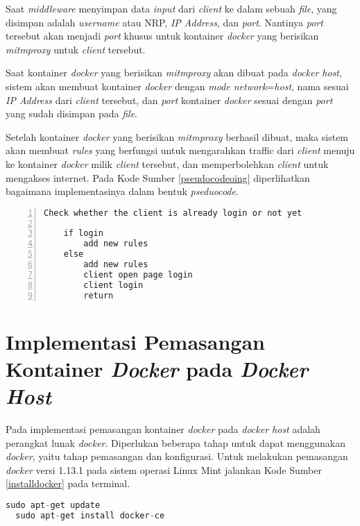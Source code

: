   Saat \textit{middleware} menyimpan data \textit{input} dari \textit{client} ke dalam sebuah \textit{file}, yang disimpan adalah \textit{username} atau NRP, \textit{IP Address}, dan \textit{port}. Nantinya \textit{port} tersebut akan menjadi \textit{port} khusus untuk kontainer \textit{docker} yang berisikan \textit{mitmproxy} untuk \textit{client} tersebut.
  
  Saat kontainer \textit{docker} yang berisikan \textit{mitmproxy} akan dibuat pada \textit{docker host}, sistem akan membuat kontainer \textit{docker} dengan \textit{mode network}=\textit{host}, nama sesuai \textit{IP Address} dari \textit{client} tersebut, dan \textit{port} kontainer \textit{docker} sesuai dengan \textit{port} yang sudah disimpan pada \textit{file}.
  
  Setelah kontainer \textit{docker} yang berisikan \textit{mitmproxy} berhasil dibuat, maka sistem akan membuat \textit{rules} yang berfungsi untuk mengarahkan traffic dari \textit{client} menuju ke kontainer \textit{docker} milik \textit{client} tersebut, dan memperbolehkan \textit{client} untuk mengakses internet. Pada Kode Sumber \ref{pseudocodeoing} diperlihatkan bagaimana implementasinya dalam bentuk \textit{pseduocode}.
  \newline
  \begin{minipage}{\linewidth}  
  	\begin{lstlisting}[numbers=left, frame=single,tabsize=2,breaklines,caption={Pseudocode Web Service},label=pseudocodeoing]
  	Check whether the client is already login or not yet
  	
  	if login
	  	add new rules
  	else
	  	add new rules
	  	client open page login
	  	client login
	  	return  	
  	\end{lstlisting}
  \end{minipage}
  
  \section{Implementasi Pemasangan Kontainer \textit{Docker} pada \textit{Docker Host}}
  Pada implementasi pemasangan kontainer \textit{docker} pada \textit{docker host} adalah perangkat lunak \textit{docker}. Diperlukan beberapa tahap untuk dapat menggunakan \textit{docker}, yaitu tahap pemasangan dan konfigurasi. Untuk melakukan pemasangan \textit{docker} versi 1.13.1 pada sistem operasi Linux Mint jalankan Kode Sumber \ref{installdocker} pada terminal.
  \newline
  \begin{minipage}{\linewidth}
  \begin{lstlisting}[caption=Perintah untuk installasi Docker,language=Python,label=installdocker]
  sudo apt-get update
  sudo apt-get install docker-ce
  \end{lstlisting}
  \end{minipage}
  

